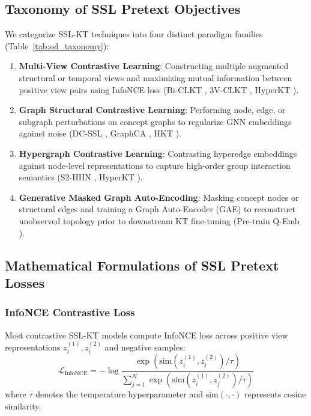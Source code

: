 \documentclass[10pt,journal,compsoc]{IEEEtran}
\begin{document}
\subsection{Taxonomy of SSL Pretext Objectives}
We categorize SSL-KT techniques into four distinct paradigm families (Table~\ref{tab:ssl_taxonomy}):
\begin{enumerate}
    \item \textbf{Multi-View Contrastive Learning}: Constructing multiple augmented structural or temporal views and maximizing mutual information between positive view pairs using InfoNCE loss (Bi-CLKT \cite{KT011_BiCLKT_2022}, 3V-CLKT \cite{KT043_3VCLKT_2024}, HyperKT \cite{KT066_HyperKT_2025}).
    \item \textbf{Graph Structural Contrastive Learning}: Performing node, edge, or subgraph perturbations on concept graphs to regularize GNN embeddings against noise (DC-SSL \cite{KT047_DCSSL_2023}, GraphCA \cite{KT050_GraphCA_2023}, HKT \cite{KT068_HKT_2025}).
    \item \textbf{Hypergraph Contrastive Learning}: Contrasting hyperedge embeddings against node-level representations to capture high-order group interaction semantics (S2-HHN \cite{KT042_S2HHN_2023}, HyperKT \cite{KT066_HyperKT_2025}).
    \item \textbf{Generative Masked Graph Auto-Encoding}: Masking concept nodes or structural edges and training a Graph Auto-Encoder (GAE) to reconstruct unobserved topology prior to downstream KT fine-tuning (Pre-train Q-Emb \cite{KT026_PretrainQ_2020}).
\end{enumerate}

\subsection{Mathematical Formulations of SSL Pretext Losses}

\subsubsection{InfoNCE Contrastive Loss}
Most contrastive SSL-KT models compute InfoNCE loss across positive view representations $z_i^{(1)}, z_i^{(2)}$ and negative samples:
\begin{equation}
\mathcal{L}_{\text{InfoNCE}} = -\log \frac{\exp(\text{sim}(z_i^{(1)}, z_i^{(2)}) / \tau)}{\sum_{j=1}^{N} \exp(\text{sim}(z_i^{(1)}, z_j^{(2)}) / \tau)}
\end{equation}
where $\tau$ denotes the temperature hyperparameter and $\text{sim}(\cdot, \cdot)$ represents cosine similarity.
\end{document}
